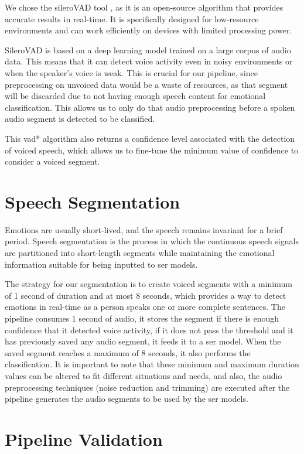 We chose the sileroVAD tool \cite{SileroVAD}, as it is an open-source algorithm that provides accurate results in real-time. It is specifically designed for low-resource environments and can work efficiently on devices with limited processing power.

SileroVAD is based on a deep learning model trained on a large corpus of audio data. This means that it can detect voice activity even in noisy environments or when the speaker's voice is weak. This is crucial for our pipeline, since preprocessing on unvoiced data would be a waste of resources, as that segment will be discarded due to not having enough speech content for emotional classification. This allows us to only do that audio preprocessing before a spoken audio segment is detected to be classified.

This \ac{vad*} algorithm also returns a confidence level associated with the detection of voiced speech, which allows us to fine-tune the minimum value of confidence to consider a voiced segment.

\section{Speech Segmentation}

Emotions are usually short-lived, and the speech remains invariant for a brief period. Speech segmentation is the process in which the continuous speech signals are partitioned into short-length segments while maintaining the emotional information suitable for being inputted to \ac{ser} models.

The strategy for our segmentation is to create voiced segments with a minimum of 1 second of duration and at most 8 seconds, which provides a way to detect emotions in real-time as a person speaks one or more complete sentences. The pipeline consumes 1 second of audio, it stores the segment if there is enough confidence that it detected voice activity, if it does not pass the threshold and it has previously saved any audio segment, it feeds it to a \ac{ser} model. When the saved segment reaches a maximum of 8 seconds, it also performs the classification. It is important to note that these minimum and maximum duration values can be altered to fit different situations and needs, and also, the audio preprocessing techniques (noise reduction and trimming) are executed after the pipeline generates the audio segments to be used by the \ac{ser} models.


\section{Pipeline Validation}

